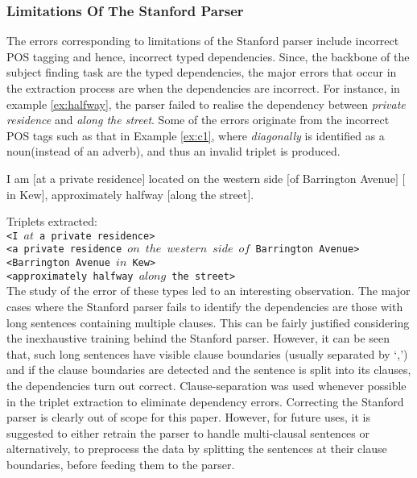 \documentclass{acm_proc_article-sp}
\begin{document}
\subsubsection{Limitations Of The Stanford Parser}
\label{subsub:stanford}
The errors corresponding to limitations of the Stanford parser include incorrect POS tagging and hence, incorrect typed dependencies. Since, the backbone of the subject finding task are the typed dependencies, the major errors that occur in the extraction process are when the dependencies are incorrect. For instance, in example \ref{ex:halfway}, the parser failed to realise the dependency between \textit{private residence} and \textit{along the street}. Some of the errors originate from the incorrect POS tags such as that in Example \ref{ex:c1}, where \textit{diagonally} is identified as a noun(instead of an adverb), and thus an invalid triplet is produced. 
\begin{example}
\label{ex:halfway}
I am $[$at a private residence$]$ located on the western side $[$of Barrington Avenue$]$ $[$in Kew$]$, approximately halfway $[$along the street$]$.
\end{example}
Triplets extracted:\\
\texttt{<I $at$ a private residence>}\\
\texttt{<a private residence  $on$  $the$ $western$ $side$ $of$ Barrington Avenue>}\\
\texttt{<Barrington Avenue $in$ Kew>}\\
\texttt{<approximately halfway $along$ the street>}\\

The study of the error of these types led to an interesting observation. The major cases where the Stanford parser fails to identify the dependencies are those with long sentences containing multiple clauses. This can be fairly justified considering the inexhaustive training behind the Stanford parser. However, it can be seen that, such long sentences have visible clause boundaries (usually separated by `,') and if the clause boundaries are detected and the sentence is split into its clauses, the dependencies turn out correct. Clause-separation was used whenever possible in the triplet extraction to eliminate dependency errors. Correcting the Stanford parser is clearly out of scope for this paper. However, for future uses, it is suggested to either retrain the parser to handle multi-clausal sentences or alternatively, to preprocess the data by splitting the sentences at their clause boundaries, before feeding them to the parser.
\end{document}
